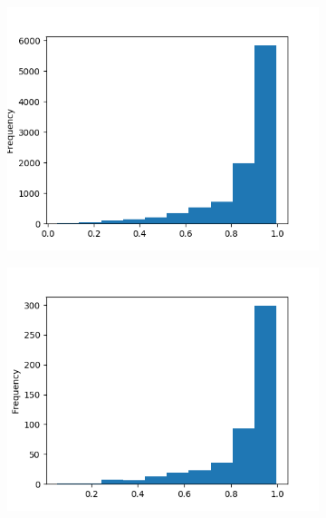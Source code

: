 \documentclass[a4paper]{article}
\begin{document}
    \begin{figure}[!ht]
        \caption{Outcome and \emph{proba} histograms.}
        \begin{subfigure}[ht]{.5\linewidth}
            \label{fig:proba}
            \centering
            \includegraphics[width=\textwidth]{./img/proba.png}
        \end{subfigure}
        \begin{subfigure}[ht]{.5\linewidth}
            \label{fig:proba-targets}
            \centering
            \includegraphics[width=\textwidth]{./img/proba-targets.png}
        \end{subfigure}


\end{figure}
\end{document}
